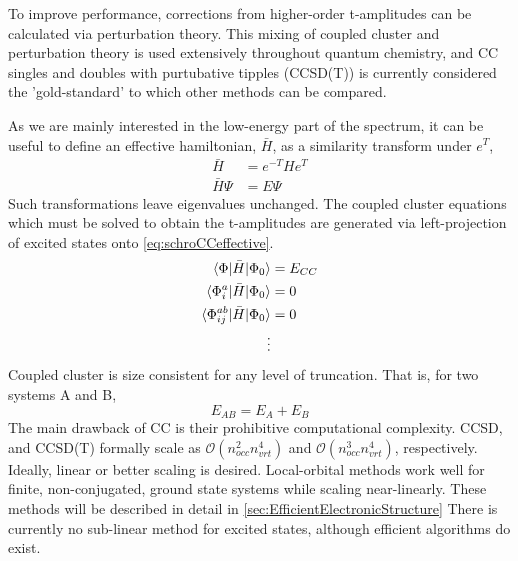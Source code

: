 To improve performance, corrections from higher-order t-amplitudes can be calculated via perturbation theory. This mixing of coupled cluster and perturbation theory is used extensively throughout quantum chemistry, and CC singles and doubles with purtubative tipples (CCSD(T)) is currently considered the 'gold-standard' to which other methods can be compared. 

As we are mainly interested in the low-energy part of the spectrum, it can be useful to define an effective hamiltonian, $\bar{H}$, as a similarity transform under $e^T$, 
\begin{align}
\bar{H}&= e^{-T} H e^T\\
\bar{H} \Psi &=E \Psi \label{eq:schroCCeffective}
\end{align}
Such transformations leave eigenvalues unchanged. The coupled cluster equations which must be solved to obtain the t-amplitudes are generated via left-projection of excited states onto  \ref{eq:schroCCeffective}. 
\begin{align}
\begin{split}
\braket{\Phi| \bar{H} |\Phi_0} &= E_{CC}\\
\braket{\Phi^a_i|\bar{H} |\Phi_0} &= 0 \\
\braket{\Phi^{ab}_{ij}|\bar{H} |\Phi_0} &= 0 \\
\vdots
\end{split}
\label{eq:cc_eqatations}
\end{align}
Coupled cluster is size consistent for any level of truncation. That is, for two systems A and B, 
\begin{equation}
E_{AB} = E_{A} + E_{B}
\end{equation}
The main drawback of CC is their prohibitive computational complexity. CCSD, and CCSD(T) formally scale as $\mathcal{O}(n_{occ}^2 n_{vrt}^4)$ and $\mathcal{O}(n_{occ}^3 n_{vrt}^4)$, respectively. Ideally, linear or better scaling is desired. Local-orbital methods work well for finite, non-conjugated, ground state systems while scaling near-linearly. These methods will be described in detail in \cref{sec:EfficientElectronicStructure} There is currently no sub-linear method for excited states, although efficient algorithms do exist. 
